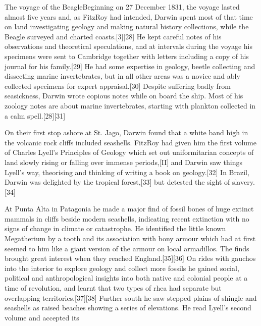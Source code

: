 \documentclass{article}
\begin{document}
The voyage of the BeagleBeginning on 27 December 1831, the voyage lasted almost five years and, as FitzRoy had intended, Darwin spent most of that time on land investigating geology and making natural history collections, while the Beagle surveyed and charted coasts.[3][28] He kept careful notes of his observations and theoretical speculations, and at intervals during the voyage his specimens were sent to Cambridge together with letters including a copy of his journal for his family.[29] He had some expertise in geology, beetle collecting and dissecting marine invertebrates, but in all other areas was a novice and ably collected specimens for expert appraisal.[30] Despite suffering badly from seasickness, Darwin wrote copious notes while on board the ship. Most of his zoology notes are about marine invertebrates, starting with plankton collected in a calm spell.[28][31]

On their first stop ashore at St. Jago, Darwin found that a white band high in the volcanic rock cliffs included seashells. FitzRoy had given him the first volume of Charles Lyell's Principles of Geology which set out uniformitarian concepts of land slowly rising or falling over immense periods,[II] and Darwin saw things Lyell's way, theorising and thinking of writing a book on geology.[32] In Brazil, Darwin was delighted by the tropical forest,[33] but detested the sight of slavery.[34]

At Punta Alta in Patagonia he made a major find of fossil bones of huge extinct mammals in cliffs beside modern seashells, indicating recent extinction with no signs of change in climate or catastrophe. He identified the little known Megatherium by a tooth and its association with bony armour which had at first seemed to him like a giant version of the armour on local armadillos. The finds brought great interest when they reached England.[35][36] On rides with gauchos into the interior to explore geology and collect more fossils he gained social, political and anthropological insights into both native and colonial people at a time of revolution, and learnt that two types of rhea had separate but overlapping territories.[37][38] Further south he saw stepped plains of shingle and seashells as raised beaches showing a series of elevations. He read Lyell's second volume and accepted its 
\end{document}
